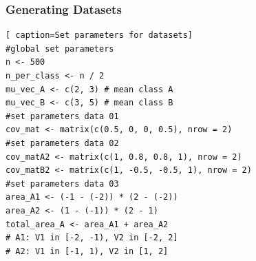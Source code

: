 \documentclass[12pt,a4paper,titlepage]{article}
\numberwithin{equation}{section}
\numberwithin{table}{section}
\numberwithin{figure}{section}
\begin{document}
        \subsubsection{Generating Datasets}\label{app:Generating Datasets}
        \begin{lstlisting}[ caption=Set parameters for datasets]
#global set parameters
n <- 500
n_per_class <- n / 2
mu_vec_A <- c(2, 3) # mean class A
mu_vec_B <- c(3, 5) # mean class B
#set parameters data 01
cov_mat <- matrix(c(0.5, 0, 0, 0.5), nrow = 2)
#set parameters data 02
cov_matA2 <- matrix(c(1, 0.8, 0.8, 1), nrow = 2) 
cov_matB2 <- matrix(c(1, -0.5, -0.5, 1), nrow = 2)
#set parameters data 03
area_A1 <- (-1 - (-2)) * (2 - (-2)) 
area_A2 <- (1 - (-1)) * (2 - 1)     
total_area_A <- area_A1 + area_A2
# A1: V1 in [-2, -1), V2 in [-2, 2]
# A2: V1 in [-1, 1), V2 in [1, 2]
        \end{lstlisting}
        \\
\end{document}
